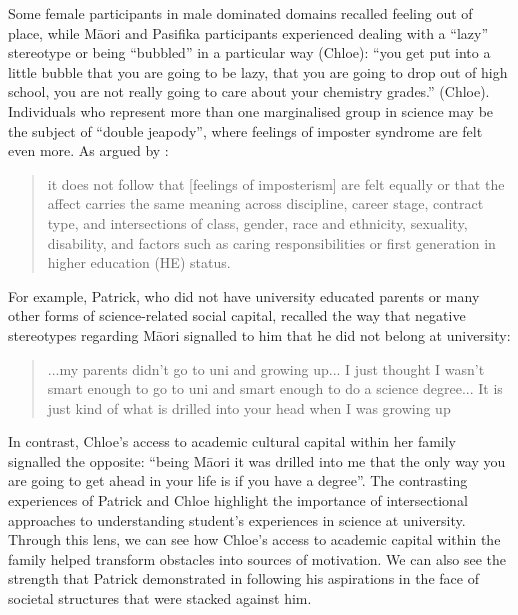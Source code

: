 Some female participants in male dominated domains recalled feeling out of place, while M\={a}ori and Pasifika participants experienced dealing with a ``lazy'' stereotype or being ``bubbled'' in a particular way (Chloe): ``you get put into a little bubble that you are going to be lazy, that you are going to drop out of high school, you are not really going to care about your chemistry grades.'' (Chloe). Individuals who represent more than one marginalised group in science may be the subject of ``double jeapody'', where feelings of imposter syndrome are felt even more. As argued by \cite[p.192]{breeze2018imposter}: \blockquote{it does not follow that [feelings of imposterism] are felt equally or that the affect carries the same meaning across discipline, career stage, contract type, and intersections of class, gender, race and ethnicity, sexuality, disability, and factors such as caring responsibilities or first generation in higher education (HE) status.} For example, Patrick, who did not have university educated parents or many other forms of science-related social capital, recalled the way that negative stereotypes regarding M\={a}ori signalled to him that he did not belong at university: \blockquote{...my parents didn't go to uni and growing up... I just thought I wasn't smart enough to go to uni and smart enough to do a science degree... It is just kind of what is drilled into your head when I was growing up} In contrast, Chloe's access to academic cultural capital within her family signalled the opposite: ``being M\={a}ori it was drilled into me that the only way you are going to get ahead in your life is if you have a degree''. The contrasting experiences of Patrick and Chloe highlight the importance of intersectional approaches to understanding student's experiences in science at university. Through this lens, we can see how Chloe's access to academic capital within the family helped transform obstacles into sources of motivation. We can also see the strength that Patrick demonstrated in following his aspirations in the face of societal structures that were stacked against him.

